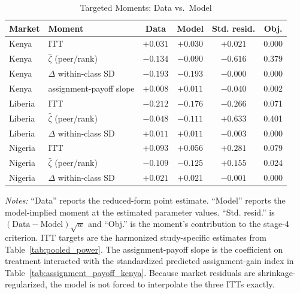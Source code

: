 \begin{table}[H]
\centering
\caption{Targeted Moments: Data vs.\ Model}
\label{tab:moment_fit}
\begin{threeparttable}
\scriptsize
\setlength{\tabcolsep}{4pt}
\begin{tabular}[t]{llcccc}
\toprule
Market & Moment & Data & Model & Std. resid. & Obj. \\
\midrule
Kenya & ITT & $+0.031$ & $+0.030$ & $+0.021$ & 0.000 \\
Kenya & $\hat{\zeta}$ (peer/rank) & $-0.134$ & $-0.090$ & $-0.616$ & 0.379 \\
Kenya & $\Delta$ within-class SD & $-0.193$ & $-0.193$ & $-0.000$ & 0.000 \\
Kenya & assignment-payoff slope & $+0.008$ & $+0.011$ & $-0.040$ & 0.002 \\
\addlinespace
Liberia & ITT & $-0.212$ & $-0.176$ & $-0.266$ & 0.071 \\
Liberia & $\hat{\zeta}$ (peer/rank) & $-0.048$ & $-0.111$ & $+0.633$ & 0.401 \\
Liberia & $\Delta$ within-class SD & $+0.011$ & $+0.011$ & $-0.003$ & 0.000 \\
\addlinespace
Nigeria & ITT & $+0.093$ & $+0.056$ & $+0.281$ & 0.079 \\
Nigeria & $\hat{\zeta}$ (peer/rank) & $-0.109$ & $-0.125$ & $+0.155$ & 0.024 \\
Nigeria & $\Delta$ within-class SD & $+0.021$ & $+0.021$ & $-0.001$ & 0.000 \\
\bottomrule
\end{tabular}
\begin{tablenotes}
\footnotesize
\item \textit{Notes:} ``Data'' reports the reduced-form point estimate. ``Model'' reports the model-implied moment at the estimated parameter values. ``Std. resid.'' is $(\text{Data}-\text{Model})\sqrt{w}$ and ``Obj.'' is the moment's contribution to the stage-4 criterion. ITT targets are the harmonized study-specific estimates from Table~\ref{tab:pooled_power}. The assignment-payoff slope is the coefficient on treatment interacted with the standardized predicted assignment-gain index in Table~\ref{tab:assignment_payoff_kenya}. Because market residuals are shrinkage-regularized, the model is not forced to interpolate the three ITTs exactly.
\end{tablenotes}
\end{threeparttable}
\end{table}
